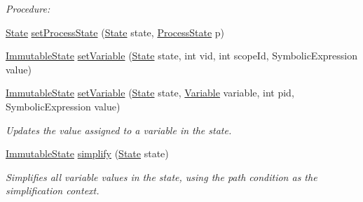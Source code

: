\begin{DoxyCompactItemize}
\begin{DoxyCompactList}\small\item\em Procedure\+: \end{DoxyCompactList}\item 
\hyperlink{interfaceedu_1_1udel_1_1cis_1_1vsl_1_1civl_1_1state_1_1IF_1_1State}{State} \hyperlink{classedu_1_1udel_1_1cis_1_1vsl_1_1civl_1_1state_1_1common_1_1immutable_1_1ImmutableStateFactory_aa3955ff83bd8eca124041041d8d4fd52}{set\+Process\+State} (\hyperlink{interfaceedu_1_1udel_1_1cis_1_1vsl_1_1civl_1_1state_1_1IF_1_1State}{State} state, \hyperlink{interfaceedu_1_1udel_1_1cis_1_1vsl_1_1civl_1_1state_1_1IF_1_1ProcessState}{Process\+State} p)
\item 
\hyperlink{classedu_1_1udel_1_1cis_1_1vsl_1_1civl_1_1state_1_1common_1_1immutable_1_1ImmutableState}{Immutable\+State} \hyperlink{classedu_1_1udel_1_1cis_1_1vsl_1_1civl_1_1state_1_1common_1_1immutable_1_1ImmutableStateFactory_ae708ff73f1b3327a5deb0b9b5016cd78}{set\+Variable} (\hyperlink{interfaceedu_1_1udel_1_1cis_1_1vsl_1_1civl_1_1state_1_1IF_1_1State}{State} state, int vid, int scope\+Id, Symbolic\+Expression value)
\item 
\hyperlink{classedu_1_1udel_1_1cis_1_1vsl_1_1civl_1_1state_1_1common_1_1immutable_1_1ImmutableState}{Immutable\+State} \hyperlink{classedu_1_1udel_1_1cis_1_1vsl_1_1civl_1_1state_1_1common_1_1immutable_1_1ImmutableStateFactory_a33ef600c8d89d0edb2ae51def702697b}{set\+Variable} (\hyperlink{interfaceedu_1_1udel_1_1cis_1_1vsl_1_1civl_1_1state_1_1IF_1_1State}{State} state, \hyperlink{interfaceedu_1_1udel_1_1cis_1_1vsl_1_1civl_1_1model_1_1IF_1_1variable_1_1Variable}{Variable} variable, int pid, Symbolic\+Expression value)
\begin{DoxyCompactList}\small\item\em Updates the value assigned to a variable in the state. \end{DoxyCompactList}\item 
\hyperlink{classedu_1_1udel_1_1cis_1_1vsl_1_1civl_1_1state_1_1common_1_1immutable_1_1ImmutableState}{Immutable\+State} \hyperlink{classedu_1_1udel_1_1cis_1_1vsl_1_1civl_1_1state_1_1common_1_1immutable_1_1ImmutableStateFactory_a6ad75dbebbe769245d9850b493ef1ce8}{simplify} (\hyperlink{interfaceedu_1_1udel_1_1cis_1_1vsl_1_1civl_1_1state_1_1IF_1_1State}{State} state)
\begin{DoxyCompactList}\small\item\em Simplifies all variable values in the state, using the path condition as the simplification context. \end{DoxyCompactList}\item 

\end{DoxyCompactItemize}
